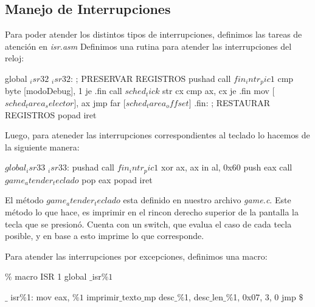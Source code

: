 \subsection{Manejo de Interrupciones}
Para poder atender los distintos tipos de interrupciones, definimos las tareas de atenci\'on en \textit{isr.asm}
Definimos una rutina para atender las interrupciones del reloj:
\begin{algorithmic}
    \State \tab global $_isr32$
\State \tab $_isr32$:
  \State \tab \tab; PRESERVAR REGISTROS
  \State \tab \tab pushad
  \State \tab \tab call $fin_intr_pic1$
  \State \tab \tab cmp byte [modoDebug], 1
  \State \tab \tab je .fin
\State \tab \tab  call $sched_tick$
  \State \tab \tab str cx
  \State \tab \tab cmp ax, cx
  \State \tab \tab je .fin
  \State \tab \tab mov [$sched_tarea_selector$], ax
  \State \tab \tab jmp far [$sched_tarea_offset$]
\State \tab \tab .fin:
  \State \tab \tab ; RESTAURAR REGISTROS
  \State \tab popad
  \State \tab iret
\end{algorithmic}

Luego, para ateneder las interrupciones correspondientes al teclado lo hacemos de la siguiente manera:
\begin{algorithmic}
    \State \tab $global _isr33$
\State \tab \tab $_isr33$:
  \State \tab \tab pushad
  \State \tab \tab call $fin_intr_pic1$
  \State \tab \tab xor ax, ax
  \State \tab \tab in al, 0x60
  \State \tab \tab push eax
  \State \tab \tab call $game_atender_teclado$
  \State \tab \tab pop eax
  \State \tab \tab popad
  \State \tab iret
\end{algorithmic}

El m\'etodo \textit{$game_atender_teclado$} esta definido en nuestro archivo \textit{game.c}. Este m\'etodo lo que hace, es imprimir en el rincon derecho superior de la pantalla la tecla que se presion\'o.
Cuenta con un switch, que evalua el caso de cada tecla posible, y en base a esto imprime lo que corresponde.


Para atender las interrupciones por excepciones, definimos una macro:
\begin{algorithmic}
\State \tab $\%$ macro ISR 1
\State \tab global $\_$isr$\%1$

\State \tab $\_$ isr$\%$1:
    \State \tab \tab mov eax, $\%1$
    \State \tab \tab imprimir$\_$texto$\_$mp desc$\_\%$1, desc$\_$len$\_\%$1, 0x07, 3, 0
    \State \tab \tab jmp $\$$

\State \tab %
\end{algorithmic}

